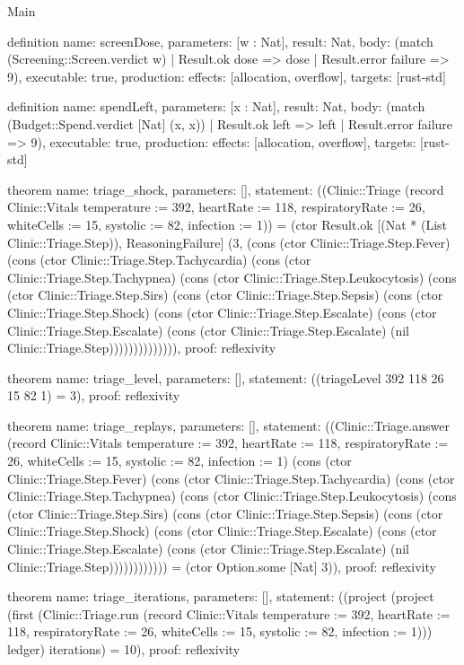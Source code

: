 \begin{lexlean}{Main}
\begin{semanticmodule}
definition{
  name: screenDose,
  parameters: [w : Nat],
  result: Nat,
  body: (match (Screening::Screen.verdict w) | Result.ok dose => dose | Result.error failure => 9),
  executable: true,
  production: {effects: [allocation, overflow], targets: [rust-std]}
}

definition{
  name: spendLeft,
  parameters: [x : Nat],
  result: Nat,
  body: (match (Budget::Spend.verdict [Nat] (x, x))
    | Result.ok left => left
    | Result.error failure => 9),
  executable: true,
  production: {effects: [allocation, overflow], targets: [rust-std]}
}

theorem{
  name: triage_shock,
  parameters: [],
  statement: ((Clinic::Triage (record Clinic::Vitals {temperature := 392, heartRate := 118, respiratoryRate := 26, whiteCells := 15, systolic := 82, infection := 1})) = (ctor Result.ok [(Nat * (List Clinic::Triage.Step)), ReasoningFailure] (3, (cons (ctor Clinic::Triage.Step.Fever) (cons (ctor Clinic::Triage.Step.Tachycardia) (cons (ctor Clinic::Triage.Step.Tachypnea) (cons (ctor Clinic::Triage.Step.Leukocytosis) (cons (ctor Clinic::Triage.Step.Sirs) (cons (ctor Clinic::Triage.Step.Sepsis) (cons (ctor Clinic::Triage.Step.Shock) (cons (ctor Clinic::Triage.Step.Escalate) (cons (ctor Clinic::Triage.Step.Escalate) (cons (ctor Clinic::Triage.Step.Escalate) (nil Clinic::Triage.Step)))))))))))))),
  proof: reflexivity{}
}

theorem{
  name: triage_level,
  parameters: [],
  statement: ((triageLevel 392 118 26 15 82 1) = 3),
  proof: reflexivity{}
}

theorem{
  name: triage_replays,
  parameters: [],
  statement: ((Clinic::Triage.answer (record Clinic::Vitals {temperature := 392, heartRate := 118, respiratoryRate := 26, whiteCells := 15, systolic := 82, infection := 1}) (cons (ctor Clinic::Triage.Step.Fever) (cons (ctor Clinic::Triage.Step.Tachycardia) (cons (ctor Clinic::Triage.Step.Tachypnea) (cons (ctor Clinic::Triage.Step.Leukocytosis) (cons (ctor Clinic::Triage.Step.Sirs) (cons (ctor Clinic::Triage.Step.Sepsis) (cons (ctor Clinic::Triage.Step.Shock) (cons (ctor Clinic::Triage.Step.Escalate) (cons (ctor Clinic::Triage.Step.Escalate) (cons (ctor Clinic::Triage.Step.Escalate) (nil Clinic::Triage.Step)))))))))))) = (ctor Option.some [Nat] 3)),
  proof: reflexivity{}
}

theorem{
  name: triage_iterations,
  parameters: [],
  statement: ((project (project (first (Clinic::Triage.run (record Clinic::Vitals {temperature := 392, heartRate := 118, respiratoryRate := 26, whiteCells := 15, systolic := 82, infection := 1}))) ledger) iterations) = 10),
  proof: reflexivity{}
}


\end{semanticmodule}
\end{lexlean}
